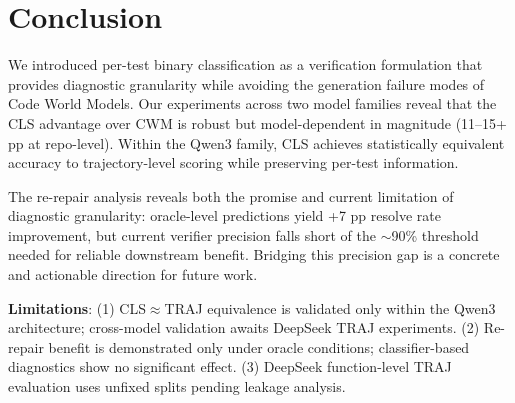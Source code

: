 \documentclass[11pt]{article}
\begin{document}
\section{Conclusion}
\label{sec:conclusion}

We introduced per-test binary classification as a verification formulation that provides diagnostic granularity while avoiding the generation failure modes of Code World Models. Our experiments across two model families reveal that the CLS advantage over CWM is robust but model-dependent in magnitude (11--15+ pp at repo-level). Within the Qwen3 family, CLS achieves statistically equivalent accuracy to trajectory-level scoring while preserving per-test information.

The re-repair analysis reveals both the promise and current limitation of diagnostic granularity: oracle-level predictions yield +7 pp resolve rate improvement, but current verifier precision falls short of the $\sim$90\% threshold needed for reliable downstream benefit. Bridging this precision gap is a concrete and actionable direction for future work.

\textbf{Limitations}: (1) CLS$\approx$TRAJ equivalence is validated only within the Qwen3 architecture; cross-model validation awaits DeepSeek TRAJ experiments. (2) Re-repair benefit is demonstrated only under oracle conditions; classifier-based diagnostics show no significant effect. (3) DeepSeek function-level TRAJ evaluation uses unfixed splits pending leakage analysis.



\end{document}
